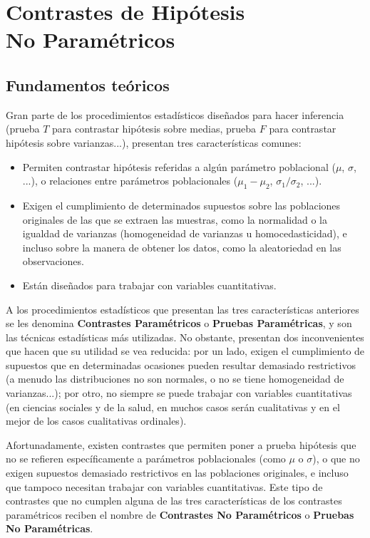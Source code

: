 
\chapter[Contrastes de hipótesis no paramétricos]{Contrastes de Hipótesis\\ No Paramétricos}


\section{Fundamentos teóricos}
Gran parte de los procedimientos estadísticos diseñados para hacer inferencia (prueba $T$ para contrastar hipótesis sobre medias, prueba $F$
para contrastar hipótesis sobre varianzas...), presentan tres características comunes:

\begin{itemize}
\item Permiten contrastar hipótesis referidas a algún parámetro poblacional ($\mu$, $\sigma$, ...), o relaciones entre parámetros
poblacionales ($\mu_1-\mu_2$, $\sigma_1/\sigma_2$, ...).

\item Exigen el cumplimiento de determinados supuestos sobre las poblaciones originales de las que se extraen las muestras, como la
normalidad o la igualdad de varianzas (homogeneidad de varianzas u homocedasticidad), e incluso sobre la manera de obtener los datos, como
la aleatoriedad en las observaciones.

\item Están diseñados para trabajar con variables cuantitativas.
\end{itemize}

A los procedimientos estadísticos que presentan las tres características anteriores se les denomina \textbf{Contrastes Paramétricos} o
\textbf{Pruebas Paramétricas}, y son las técnicas estadísticas más utilizadas. No obstante, presentan dos inconvenientes que hacen que su
utilidad se vea reducida: por un lado, exigen el cumplimiento de supuestos que en determinadas ocasiones pueden resultar demasiado
restrictivos (a menudo las distribuciones no son normales, o no se tiene homogeneidad de varianzas...); por otro, no siempre se puede
trabajar con variables cuantitativas (en ciencias sociales y de la salud, en muchos casos serán cualitativas y en el mejor de los casos
cualitativas ordinales).

Afortunadamente, existen contrastes que permiten poner a prueba hipótesis que no se refieren específicamente a parámetros poblacionales
(como $\mu$ o $\sigma$), o que no exigen supuestos demasiado restrictivos en las poblaciones originales, e incluso que tampoco necesitan
trabajar con variables cuantitativas. Este tipo de contrastes que no cumplen alguna de las tres características de los contrastes
paramétricos reciben el nombre de \textbf{Contrastes No Paramétricos} o \textbf{Pruebas No Paramétricas}.

